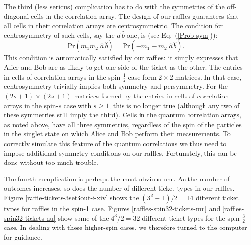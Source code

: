 The third (less serious) complication has to do with the symmetries of the off-diagonal cells in the correlation array. The design of our raffles guarantees that all cells in their correlation arrays are centrosymmetric. The condition for centrosymmetry of such cells, say the  $\hat{a} \, \hat{b}$ one,  is (see Eq.\ (\ref{Prob sym})): 
\begin{equation}
\mathrm{Pr}(m_1 m_2| \hat{a} \,\hat{b}) = \mathrm{Pr}(-m_1 -\!m_2| \hat{a} \,\hat{b}).
\label{raffle cell centro-symmetry} 
\end{equation}
This condition is automatically satisfied by our raffles: it simply expresses that Alice and Bob are as likely to get one side of the ticket as the other. The entries in cells of correlation arrays in the spin-$\frac12$ case form $2 \times 2$ matrices. In that case, centrosymmetry trivially implies both symmetry and persymmetry. For the $(2s +1) \times (2s +1)$ matrices formed by the entries in cells of correlation arrays in the spin-$s$ case with $s \ge 1$, this is no longer true (although any two of these symmetries still imply the third). Cells in the quantum correlation arrays, as noted above, have all three symmetries, regardless of the spin of the particles in the singlet state on which Alice and Bob perform their measurements. To correctly simulate this feature of the quantum correlations we thus need to impose additional symmetry conditions on our raffles. Fortunately, this can be done without too much trouble.

The fourth complication is perhaps the most obvious one. As the number of outcomes increases, so does the number of different ticket types in our raffles. Figure \ref{raffle-tickets-3set3out-i-xiv} shows the $(3^3 + 1)/2 = 14$ different ticket types for raffles in the spin-1 case. Figures \ref{raffles-spin32-tickets-mu} and \ref{raffles-spin32-tickets-nu} show some of the $4^3/2 = 32$ different ticket types for the spin-$\frac32$ case. In dealing with these higher-spin cases, we therefore turned to the computer for guidance.

